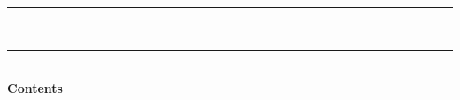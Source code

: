 \clearpage
\def\chapcode{}%
\renewcommand\capsshorttitle{Contents}%
\thispagestyle{fmplain}%
\pagestyle{fmfancy}%
%
\begin{center}
  \rule{0.85\textwidth}{0.5pt}\\[1.5pt]
  \rule{0.85\textwidth}{2pt}\\[1.2\baselineskip]
  {\Huge\bfseries Contents}
\end{center}
\vspace{3\baselineskip}
\makeatletter
%
\makeatother
\clearpage
